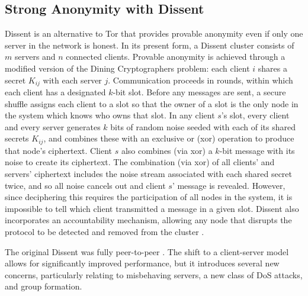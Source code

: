   \subsection{Strong Anonymity with Dissent}
    Dissent is an alternative to Tor that provides provable anonymity even if
    only one server in the network is honest\cite{p2pd}.
    In its present form, a Dissent cluster consists of $m$ servers and $n$
    connected clients\cite{din}. Provable anonymity is
    achieved through a modified version of the Dining Cryptographers
    problem\cite{chaum_dining_1988}: each client $i$ shares a secret $K_{ij}$
    with each server $j$. Communication proceeds in rounds, within which each
    client has a designated $k$-bit slot.  Before any messages are sent, a
    secure shuffle\cite{neff} assigns each client to a slot so
    that the owner of a slot is the only node in the system which knows who owns
    that slot.  In any client $s$'s slot, every client and every server
    generates $k$ bits of random noise seeded with each of its shared secrets
    $K_{ij}$, and combines these with an exclusive or (xor) operation to produce
    that node's ciphertext. Client $s$ also combines (via xor) a $k$-bit message
    with its noise to create its ciphertext. The combination (via xor) of all
    clients' and servers' ciphertext includes the noise stream associated with
    each shared secret twice, and so all noise cancels out and client $s$'
    message is revealed. However, since deciphering this requires the
    participation of all nodes in the system, it is impossible to tell which
    client transmitted a message in a given slot. Dissent also incorporates an
    accountability mechanism, allowing any node that disrupts the protocol to be
    detected and removed from the cluster
    \cite{verdict}.

    The original Dissent was fully peer-to-peer
    \cite{p2pd}. The shift to a client-server model
    allows for significantly improved performance, but it introduces several new
    concerns, particularly relating to misbehaving servers, a new class of DoS
    attacks, and group formation.

